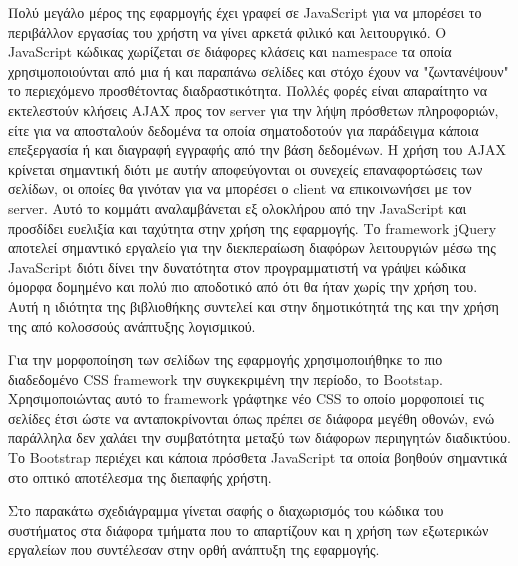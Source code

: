 Πολύ μεγάλο μέρος της εφαρμογής έχει γραφεί σε JavaScript για να μπορέσει το περιβάλλον εργασίας του χρήστη να γίνει αρκετά φιλικό και λειτουργικό. Ο JavaScript κώδικας χωρίζεται σε διάφορες κλάσεις και namespace τα οποία χρησιμοποιούνται από μια ή και παραπάνω σελίδες και στόχο έχουν να "ζωντανέψουν" το περιεχόμενο προσθέτοντας διαδραστικότητα. Πολλές φορές είναι απαραίτητο να εκτελεστούν κλήσεις AJAX προς τον server για την λήψη πρόσθετων πληροφοριών, είτε για να αποσταλούν δεδομένα τα οποία σηματοδοτούν για παράδειγμα κάποια επεξεργασία ή και διαγραφή εγγραφής από την βάση δεδομένων. Η χρήση του AJAX κρίνεται σημαντική διότι με αυτήν αποφεύγονται οι συνεχείς επαναφορτώσεις των σελίδων, οι οποίες θα γινόταν για να μπορέσει ο client να επικοινωνήσει με τον server. Αυτό το κομμάτι αναλαμβάνεται εξ ολοκλήρου από την JavaScript και προσδίδει ευελιξία και ταχύτητα στην χρήση της εφαρμογής. Το framework jQuery αποτελεί σημαντικό εργαλείο για την διεκπεραίωση διαφόρων λειτουργιών μέσω της JavaScript διότι δίνει την δυνατότητα στον προγραμματιστή να γράψει κώδικα όμορφα δομημένο και πολύ πιο αποδοτικό από ότι θα ήταν χωρίς την χρήση του. Αυτή η ιδιότητα της βιβλιοθήκης συντελεί και στην δημοτικότητά της και την χρήση της από κολοσσούς ανάπτυξης λογισμικού.

Για την μορφοποίηση των σελίδων της εφαρμογής χρησιμοποιήθηκε το πιο διαδεδομένο CSS framework την συγκεκριμένη την περίοδο, το Bootstap. Χρησιμοποιώντας αυτό το framework γράφτηκε νέο CSS το οποίο μορφοποιεί τις σελίδες έτσι ώστε να ανταποκρίνονται όπως πρέπει σε διάφορα μεγέθη οθονών, ενώ παράλληλα δεν χαλάει την συμβατότητα μεταξύ των διάφορων περιηγητών διαδικτύου. Το Bootstrap περιέχει και κάποια πρόσθετα JavaScript τα οποία βοηθούν σημαντικά στο οπτικό αποτέλεσμα της διεπαφής χρήστη.

Στο παρακάτω σχεδιάγραμμα γίνεται σαφής ο διαχωρισμός του κώδικα του συστήματος στα διάφορα τμήματα που το απαρτίζουν και η χρήση των εξωτερικών εργαλείων που συντέλεσαν στην ορθή ανάπτυξη της εφαρμογής.

